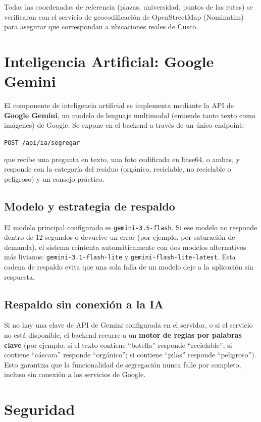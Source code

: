 \documentclass[11pt,a4paper]{article}
\begin{document}
Todas las coordenadas de referencia (plazas, universidad, puntos de las rutas) se verificaron con el servicio de geocodificación de OpenStreetMap (Nominatim) para asegurar que correspondan a ubicaciones reales de Cusco.

\section{Inteligencia Artificial: Google Gemini}
\label{sec:ia}

El componente de inteligencia artificial se implementa mediante la API de \textbf{Google Gemini}, un modelo de lenguaje multimodal (entiende tanto texto como imágenes) de Google. Se expone en el backend a través de un único endpoint:

\begin{center}
\texttt{POST /api/ia/segregar}
\end{center}

que recibe una pregunta en texto, una foto codificada en base64, o ambas, y responde con la categoría del residuo (orgánico, reciclable, no reciclable o peligroso) y un consejo práctico.

\subsection{Modelo y estrategia de respaldo}
El modelo principal configurado es \texttt{gemini-3.5-flash}. Si ese modelo no responde dentro de 12 segundos o devuelve un error (por ejemplo, por saturación de demanda), el sistema reintenta automáticamente con dos modelos alternativos más livianos: \texttt{gemini-3.1-flash-lite} y \texttt{gemini-flash-lite-latest}. Esta cadena de respaldo evita que una sola falla de un modelo deje a la aplicación sin respuesta.

\subsection{Respaldo sin conexión a la IA}
Si no hay una clave de API de Gemini configurada en el servidor, o si el servicio no está disponible, el backend recurre a un \textbf{motor de reglas por palabras clave} (por ejemplo: si el texto contiene ``botella'' responde ``reciclable''; si contiene ``cáscara'' responde ``orgánico''; si contiene ``pilas'' responde ``peligroso''). Esto garantiza que la funcionalidad de segregación nunca falle por completo, incluso sin conexión a los servicios de Google.

\section{Seguridad}
\end{document}

